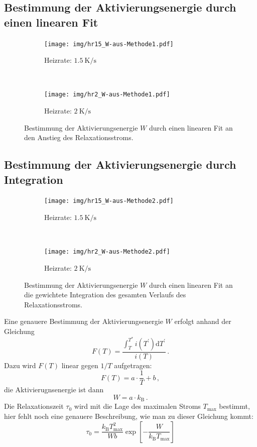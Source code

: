 \subsection{Bestimmung der Aktivierungsenergie durch einen linearen Fit}

\begin{figure}[htp]
    \centering
    \begin{subfigure}[t]{0.5\textwidth}
        \centering
        \texttt{[image: img/hr15\_W-aus-Methode1.pdf]}
        \caption{Heizrate: $\SI{1.5}{\kelvin\per\second}$}
    \end{subfigure}%
    ~
    \begin{subfigure}[t]{0.5\textwidth}
        \centering
        \texttt{[image: img/hr2\_W-aus-Methode1.pdf]}
        \caption{Heizrate: $\SI{2}{\kelvin\per\second}$}
    \end{subfigure}
    \caption{Bestimmung der Aktivierungsenergie $W$ durch einen linearen Fit an den Anstieg des Relaxationsstroms.}
\end{figure}

\subsection{Bestimmung der Aktivierungsenergie durch Integration}

\begin{figure}[htp]
    \centering
    \begin{subfigure}[t]{0.5\textwidth}
        \centering
        \texttt{[image: img/hr15\_W-aus-Methode2.pdf]}
        \caption{Heizrate: $\SI{1.5}{\kelvin\per\second}$}
    \end{subfigure}%
    ~
    \begin{subfigure}[t]{0.5\textwidth}
        \centering
        \texttt{[image: img/hr2\_W-aus-Methode2.pdf]}
        \caption{Heizrate: $\SI{2}{\kelvin\per\second}$}
    \end{subfigure}
    \caption{Bestimmung der Aktivierungsenergie $W$ durch einen linearen Fit an die gewichtete Integration des gesamten Verlaufs des Relaxationsstroms.}
\end{figure}

Eine genauere Bestimmung der Aktivierungsenergie $W$ erfolgt anhand der Gleichung
\begin{equation*}
    F(T) = \frac{\int_T^{T^\ast} i(T^\prime)\mathrm{d}T^\prime}{i(T)}\,.
\end{equation*}
Dazu wird $F(T)$ linear gegen $1/T$ aufgetragen:
\begin{equation*}
    F(T) = a \cdot\frac{1}{T} + b\,,
\end{equation*}
die Aktivierugnsenergie ist dann
\begin{equation*}
    W = a \cdot k_\text{B}\,.
\end{equation*}
Die Relaxationszeit $\tau_0$ wird mit die Lage des maximalen Stroms $T_\text{max}$ bestimmt, hier fehlt noch eine genauere Beschreibung, wie man zu dieser Gleichung kommt:
\begin{equation}
    \label{eqn:tau0}
    \tau_0 = \frac{k_\text{B}T_\text{max}^2}{Wb}
             \exp\!\left[-\frac{W}{k_\text{B}T_\text{max}} \right]
\end{equation}
